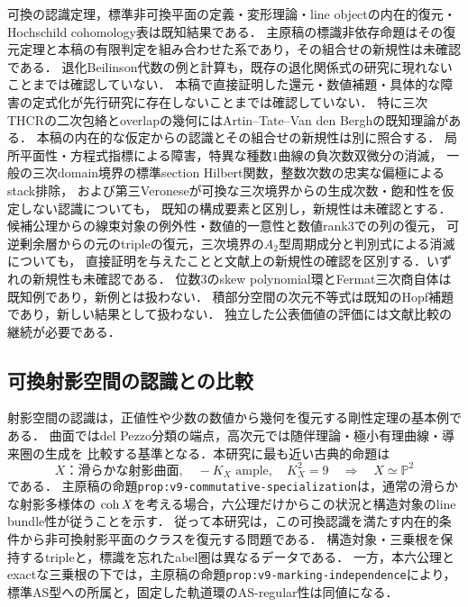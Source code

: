 \documentclass[11pt,a4paper]{ltjsarticle}
\begin{document}
\begin{description}[style=nextline]
可換の認識定理，標準非可換平面の定義・変形理論・line objectの内在的復元・Hochschild cohomology表は既知結果である．
主原稿の標識非依存命題はその復元定理と本稿の有限判定を組み合わせた系であり，その組合せの新規性は未確認である．
退化Beilinson代数の例と計算も，既存の退化関係式の研究に現れないことまでは確認していない．
本稿で直接証明した還元・数値補題・具体的な障害の定式化が先行研究に存在しないことまでは確認していない．
特に三次THCRの二次包絡とoverlapの幾何にはArtin--Tate--Van den Berghの既知理論がある．
本稿の内在的な仮定からの認識とその組合せの新規性は別に照合する．
局所平面性・方程式指標による障害，特異な種数$1$曲線の負次数双微分の消滅，
一般の三次domain境界の標準section Hilbert関数，整数次数の忠実な偏極によるstack排除，
および第三Veroneseが可換な三次境界からの生成次数・飽和性を仮定しない認識についても，
既知の構成要素と区別し，新規性は未確認とする．
候補公理からの線束対象の例外性・数値的一意性と数値rank3での列の復元，
可逆剰余層からの元のtripleの復元，三次境界の$A_2$型周期成分と判別式による消滅についても，
直接証明を与えたことと文献上の新規性の確認を区別する．いずれの新規性も未確認である．
位数$3$のskew polynomial環とFermat三次商自体は既知例であり，新例とは扱わない．
積部分空間の次元不等式は既知のHopf補題であり，新しい結果として扱わない．
独立した公表価値の評価には文献比較の継続が必要である．
\end{description}

\subsection{可換射影空間の認識との比較}\label{subsec:v9-classical-recognition}

射影空間の認識は，正値性や少数の数値から幾何を復元する剛性定理の基本例である．
曲面ではdel Pezzo分類の端点，高次元では随伴理論・極小有理曲線・導来圏の生成を
比較する基準となる．本研究に最も近い古典的命題は
\[
 X\text{：滑らかな射影曲面},\quad -K_X\text{ ample},\quad K_X^2=9
 \quad\Longrightarrow\quad X\simeq\mathbb P^2
\]
である\cite[\S2.1, \S3.1.1]{DolgachevMartin}．
主原稿の命題\texttt{prop:v9-commutative-specialization}は，通常の滑らかな射影多様体の
$\operatorname{coh} X$を考える場合，六公理だけからこの状況と構造対象のline bundle性が従うことを示す．
従って本研究は，この可換認識を満たす内在的条件から非可換射影平面のクラスを復元する問題である．
構造対象・三乗根を保持するtripleと，標識を忘れたabel圏は異なるデータである．
一方，本六公理とexactな三乗根の下では，主原稿の命題\texttt{prop:v9-marking-independence}により，
標準AS型への所属と，固定した軌道環のAS-regular性は同値になる．
\end{document}

